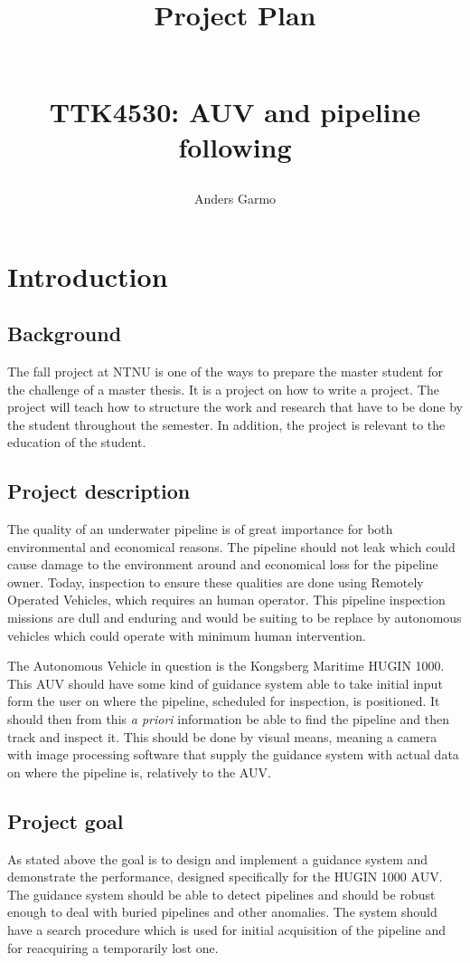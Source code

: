 \documentclass[a4paper,10pt]{article}
\title{\begin{huge}\textbf{Project Plan}\end{huge} \\ TTK4530: AUV and pipeline following}
\author{Anders Garmo}
\begin{document}
\maketitle
\newpage


\section{Introduction}

	\subsection{Background}
	The fall project at NTNU is one of the ways to prepare the master student for the challenge of a master thesis. It is a project on how to write a project. The project will teach how to structure the work and research that have to be done by the student throughout the semester. In addition, the project is relevant to the education of the student.
	
	
	\subsection{Project description}
	The quality of an underwater pipeline is of great importance for both environmental and economical reasons. The pipeline should not leak which could cause damage to the environment around and economical loss for the pipeline owner. Today, inspection to ensure these qualities are done using Remotely Operated Vehicles, which requires an human operator. This pipeline inspection missions are dull and enduring and would be suiting to be replace by autonomous vehicles which could operate with minimum human intervention.
	
	The Autonomous Vehicle in question is the Kongsberg Maritime HUGIN 1000. This AUV should have some kind of guidance system able to take initial input form the user on where the pipeline, scheduled for inspection, is positioned. It should then from this \textit{a priori} information be able to find the pipeline and then track and inspect it. This should be done by visual means, meaning a camera with image processing software that supply the guidance system with actual data on where the pipeline is, relatively to the AUV.
	
	\subsection{Project goal}
	As stated above the goal is to design and implement a guidance system and demonstrate the performance, designed specifically for the HUGIN 1000 AUV. The guidance system should be able to detect pipelines and should be robust enough to deal with buried pipelines and other anomalies. The system should have a search procedure which is used for initial acquisition of the pipeline and for reacquiring a temporarily lost one. 
\end{document}

